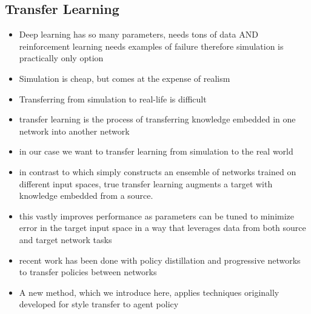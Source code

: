 \documentclass[paper=a4, fontsize=11pt]{scrartcl} %
\begin{document}
	\subsection{Transfer Learning}
	\begin{itemize}
		\item Deep learning has so many parameters, needs tons of data AND reinforcement learning needs examples of failure therefore simulation is practically only option
		\item Simulation is cheap, but comes at the expense of realism
		\item Transferring from simulation to real-life is difficult
		\item transfer learning is the process of transferring knowledge embedded in one network into another network
		\item in our case we want to transfer learning from simulation to the real world
		\item in contrast to \cite{Michels2005} which simply constructs an ensemble of networks trained on different input spaces, true transfer learning augments a target with knowledge embedded from a source.
		\item this vastly improves performance as parameters can be tuned to minimize error in the target input space in a way that leverages data from both source and target network tasks
		\item recent work has been done with policy distillation \cite{Rusu2015} and progressive networks \cite{Rusu2016} to transfer policies between networks
		\item A new method, which we introduce here, applies techniques originally developed for style transfer to agent policy~\cite{Gatys2015}
	\end{itemize}
\end{document}
